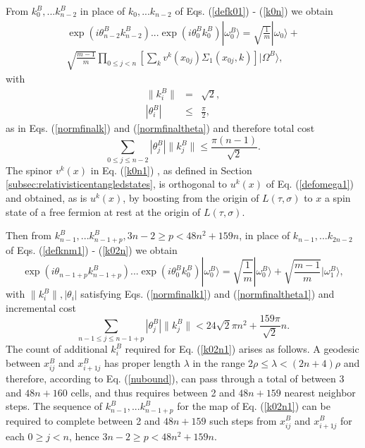 \documentclass[12pt,amsmath,amssymb,onecolumn]{revtex4-2}
\begin{document}
From $k^B_0, ... k^B_{n-2}$ in place of $k_0, ... k_{n-2}$ of Eqs. (\ref{defk01}) - (\ref{k0n})
we obtain
\begin{multline}
\label{k0n1}
\exp( i \theta^B_{n-2} k^B_{n-2}) ... \exp( i \theta_0 ^Bk^B_0) |\omega^B_0 \rangle  = 
\sqrt{\frac{1}{m}} |\omega_0 \rangle  + \\
\sqrt{\frac{m - 1}{m}} \prod_{0 \le j < n} [\sum_k v^k(x_{0j}) \Sigma _1( x_{0j}, k)] |\Omega^B \rangle ,
\end{multline}
with
\begin{subequations}
\begin{eqnarray}
\label{normfinalk1}
\parallel k_i^B \parallel & = & \sqrt{2},\\
\label{normfinaltheta1}
| \theta_i^B | & \le & \frac{\pi}{2},
\end{eqnarray}
\end{subequations}
as in Eqs. (\ref{normfinalk}) and
(\ref{normfinaltheta}) and therefore total cost
\begin{equation}
  \label{kbcost}
  \sum_{0 \le j \le n - 2} |\theta^B_j| \parallel k^B_j \parallel \le \frac{ \pi (n - 1)}{\sqrt{2}}.
\end{equation}
The spinor $v^k(x)$ in Eq. (\ref{k0n1}) ,
as defined in Section \ref{subsec:relativisticentangledstates},
is orthogonal to $u^k(x)$ of Eq. (\ref{defomega1})
and obtained, as is $u^k(x)$, by boosting from the
origin of $L( \tau, \sigma)$ to $x$
a spin state of a free fermion at rest at
the origin of $L( \tau, \sigma)$.


Then from $k^B_{n-1}, ... k^B_{n - 1 +p}, 3n - 2 \ge p < 48 n^2 + 159 n$,
in place of
$k_{n-1}, ... k_{2n-2}$ of
Eqs. (\ref{defknm1}) - (\ref{k02n}) we obtain
\begin{equation}
\label{k02n1}
\exp( i \theta_{n-1 + p} k^B_{n-1 + p}) ... \exp( i \theta_0 ^Bk^B_0) |\omega^B_0 \rangle  =
\sqrt{\frac{1}{m}} |\omega^B_0 \rangle  +
\sqrt{\frac{m -1}{m}} |\omega^B_1 \rangle ,
\end{equation}
with $\parallel k^B_i \parallel, |\theta_i|$ satisfying Eqs. (\ref{normfinalk1}) and
(\ref{normfinaltheta1})
and incremental cost
\begin{equation}
  \label{kbcost1}
  \sum_{n-1\le j \le n - 1 +p} |\theta^B_j| \parallel k^B_j \parallel < 24 \sqrt{2} \pi n^2 + \frac{159 \pi}{\sqrt{2}} n.
\end{equation}
The count of additional $k^B_i$ required for Eq. (\ref{k02n1}) arises as follows.
A geodesic between $x^B_{ij}$ and $x^B_{i+1j}$ has proper length $\lambda$ in the range $2 \rho \le \lambda < (2 n + 4) \rho$
and therefore, according to Eq. (\ref{nubound}), can pass through a total of between 3
and $48 n + 160$ cells, and thus requires between 2 and $48 n + 159$
nearest neighbor steps. The sequence of $k^B_{n-1}, ... k^B_{n - 1 +p}$
for the map of Eq. (\ref{k02n1})
can be required to complete between 2 and $48 n + 159$ such steps from $x^B_{ij}$ and $x^B_{i+1j}$
for each $0 \ge j < n$, hence $3n - 2 \ge p < 48 n^2 + 159 n$.
\end{document}
